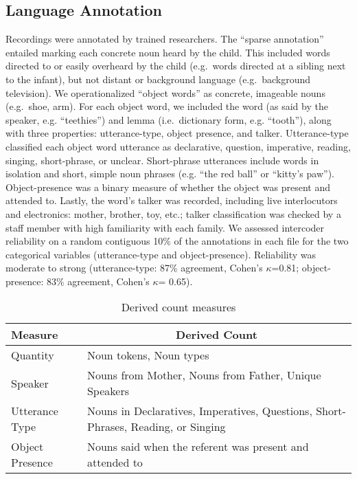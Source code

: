 \documentclass[floatsintext,man]{apa6}
\theoremstyle{definition}
\theoremstyle{definition}
\theoremstyle{definition}
\theoremstyle{remark}
\begin{document}
\subsection{Language Annotation}\label{language-annotation}

Recordings were annotated by trained researchers. The \enquote{sparse
annotation} entailed marking each concrete noun heard by the child. This
included words directed to or easily overheard by the child (e.g.~words
directed at a sibling next to the infant), but not distant or background
language (e.g.~background television). We operationalized
\enquote{object words} as concrete, imageable nouns (e.g.~shoe, arm).
For each object word, we included the word (as said by the speaker, e.g.
\enquote{teethies}) and lemma (i.e.~dictionary form, e.g.
\enquote{tooth}), along with three properties: utterance-type, object
presence, and talker. Utterance-type classified each object word
utterance as declarative, question, imperative, reading, singing,
short-phrase, or unclear. Short-phrase utterances include words in
isolation and short, simple noun phrases (e.g. \enquote{the red ball} or
\enquote{kitty's paw}). Object-presence was a binary measure of whether
the object was present and attended to. Lastly, the word's talker was
recorded, including live interlocutors and electronics: mother, brother,
toy, etc.; talker classification was checked by a staff member with high
familiarity with each family. We assessed intercoder reliability on a
random contiguous 10\% of the annotations in each file for the two
categorical variables (utterance-type and object-presence). Reliability
was moderate to strong (utterance-type: 87\% agreement, Cohen's
\(\kappa\)=0.81; object-presence: 83\% agreement, Cohen's \(\kappa\)=
0.65).

\begin{table}[tbp]
\begin{center}
\begin{threeparttable}
\caption{\label{tab:measures-tab}Derived count measures}
\small{
\begin{tabular}{ll}
\toprule
Measure & \multicolumn{1}{c}{Derived Count}\\
\midrule
Quantity & Noun tokens, Noun types\\
Speaker & Nouns from Mother, Nouns from Father, Unique Speakers\\
Utterance Type & Nouns in Declaratives, Imperatives, Questions, Short-Phrases, Reading, or Singing\\
Object Presence & Nouns said when the referent was present and attended to\\
\bottomrule
\end{tabular}
}
\end{threeparttable}
\end{center}
\end{table}
\end{document}
